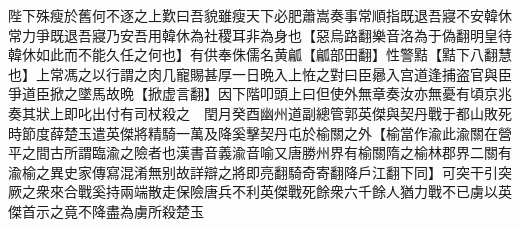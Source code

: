 陛下殊瘦於舊何不逐之上歎曰吾貌雖瘦天下必肥蕭嵩奏事常順指既退吾寢不安韓休常力爭既退吾寢乃安吾用韓休為社稷耳非為身也【惡烏路翻樂音洛為于偽翻明皇待韓休如此而不能久任之何也】有供奉侏儒名黄㼐【㼐部田翻】性警黠【黠下八翻慧也】上常馮之以行謂之肉几寵賜甚厚一日晩入上恠之對曰臣曏入宫道逢捕盗官與臣爭道臣掀之墜馬故晩【掀虚言翻】因下階叩頭上曰但使外無章奏汝亦無憂有頃京兆奏其狀上即叱出付有司杖殺之　閏月癸酉幽州道副總管郭英傑與契丹戰于都山敗死時節度薛楚玉遣英傑將精騎一萬及降奚擊契丹屯於榆關之外【榆當作渝此渝關在營平之間古所謂臨渝之險者也漢書音義渝音喻又唐勝州界有榆關隋之榆林郡界二關有渝榆之異史家傳寫混淆無别故詳辯之將即亮翻騎奇寄翻降戶江翻下同】可突干引突厥之衆來合戰奚持兩端散走保險唐兵不利英傑戰死餘衆六千餘人猶力戰不已虜以英傑首示之竟不降盡為虜所殺楚玉